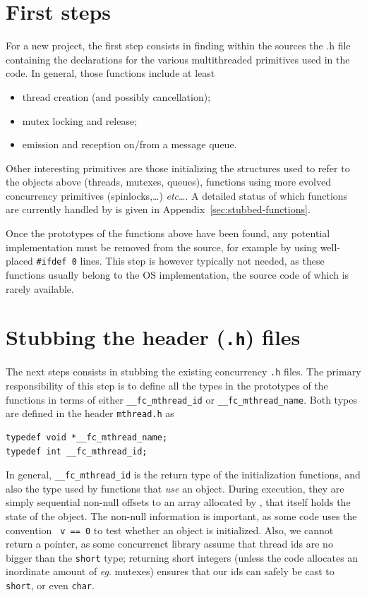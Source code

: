 \documentclass{frama-c-book}
\def\etc{\emph{etc}\ldots}
\def\eg.{\emph{eg}.}
\def\myappdx#1{Appendix~{\ref{sec:#1}}}
\begin{document}
\section{First steps}

For a new project, the first step consists in finding within
the \C sources the {\sf .h} file containing the declarations
for the various multithreaded primitives used in the code.
In general, those functions include at least
\begin{itemize}
\item thread creation (and possibly cancellation);
\item mutex locking and release;
\item emission and reception on/from a message queue.
\end{itemize}
Other interesting primitives are those initializing the
structures used to refer to the objects above (threads, mutexes,
queues), functions using more evolved concurrency primitives
(spinlocks,\ldots) \etc. A detailed status of which functions
are currently handled by \mthread is given in
\myappdx{stubbed-functions}.

Once the prototypes of the functions above have been found, any
potential implementation must be removed from the source, for example
by using well-placed \verb+#ifdef 0+ lines. This step is however
typically not needed, as these functions usually belong to the OS
implementation, the source code of which is rarely available.



\section{Stubbing the header (\texttt{.h}) files}

The next steps consists in stubbing the existing concurrency \verb+.h+ files.
The primary responsibility of this step is to define all the types
in the prototypes of the functions in terms of either
\verb+__fc_mthread_id+ or \verb+__fc_mthread_name+. Both types are
defined in the \mthread header \verb+mthread.h+ as

\begin{lstlisting}[language={[ANSI]C}]
typedef void *__fc_mthread_name;
typedef int __fc_mthread_id;
\end{lstlisting}

In general, \verb+__fc_mthread_id+ is the return type of the initialization
functions, and also the type used by functions that {\it use} an object.
During execution, they are simply sequential non-null offsets to an array
allocated by \mthread, that itself holds the state of the object. The non-null
information is important, as some code uses the convention \verb+ v == 0+ to
test whether an object is initialized. Also, we cannot return a pointer, as
some concurrenct library assume that thread ids are no bigger than the
\verb+short+
type; returning short integers (unless the code allocates an inordinate
amount of \eg. mutexes) ensures that our ids can safely be cast to
\verb+short+, or even \verb+char+.
\end{document}

